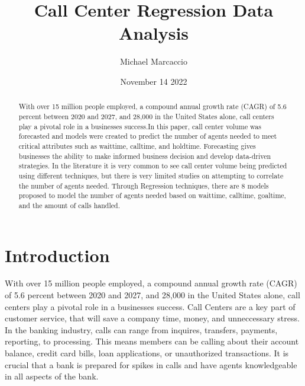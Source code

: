 \documentclass[12pt]{article}
\title{Call Center Regression Data Analysis}
\author{Michael  Marcaccio}
\date{November 14 2022}
\begin{document}
\maketitle

\begin{abstract}
 With over 15 million people employed, a compound annual growth rate (CAGR) of 5.6 percent between 2020 and 2027, and 28,000
 in the United States alone, call centers play a pivotal role in a businesses success.In this paper, call center volume was forecasted and
 models were created to predict the number of agents needed to meet critical attributes such as waittime, calltime, and holdtime. 
 Forecasting gives businesses the ability to make informed business decision and develop data-driven strategies. In the literature it is very
 common to see call center volume being predicted using different techniques, but there is very limited studies on attempting to correlate
 the number of agents needed. Through Regression techniques, there are 8 models proposed to model the number of agents needed based on waittime,
 calltime, goaltime, and the amount of calls handled.
\end{abstract}

\section*{Introduction}
  With over 15 million people employed, a compound annual growth rate (CAGR) of 5.6 percent between 2020 and 2027, and 28,000
in the United States alone, call centers play a pivotal role in a businesses success. Call Centers are a key part of customer service,
that will save a company time, money, and unneccessary stress. In the banking industry, calls can range from inquires, transfers, 
payments, reporting, to processing. This means members can be calling about their account balance, credit card bills, loan applications, 
or unauthorized transactions. It is crucial that a bank is prepared for spikes in calls and have agents knowledgeable in all aspects of the bank.
\end{document}
